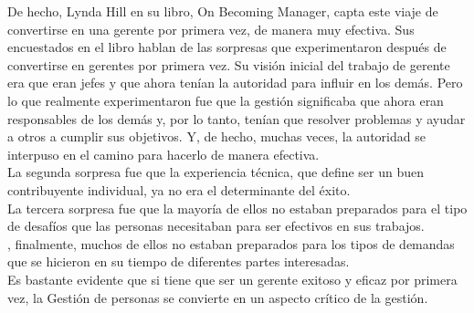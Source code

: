 \documentclass[10pt]{book}
\begin{document}
De hecho, Lynda Hill en su libro, On Becoming Manager, capta este viaje de convertirse en una gerente por primera vez, de manera muy efectiva. Sus encuestados en el libro hablan de las sorpresas que experimentaron después de convertirse en gerentes por primera vez. Su visión inicial del trabajo de gerente era que eran jefes y que ahora tenían la autoridad para influir en los demás. Pero lo que realmente experimentaron fue que la gestión significaba que ahora eran responsables de los demás y, por lo tanto, tenían que resolver problemas y ayudar a otros a cumplir sus objetivos. Y, de hecho, muchas veces, la autoridad se interpuso en el camino para hacerlo de manera efectiva.\\
La segunda sorpresa fue que la experiencia técnica, que define ser un buen contribuyente individual, ya no era el determinante del éxito.\\
La tercera sorpresa fue que la mayoría de ellos no estaban preparados para el tipo de desafíos que las personas necesitaban para ser efectivos en sus trabajos.\\
, finalmente, muchos de ellos no estaban preparados para los tipos de demandas que se hicieron en su tiempo de diferentes partes interesadas.\\
Es bastante evidente que si tiene que ser un gerente exitoso y eficaz por primera vez, la Gestión de personas se convierte en un aspecto crítico de la gestión.\\
\end{document}
